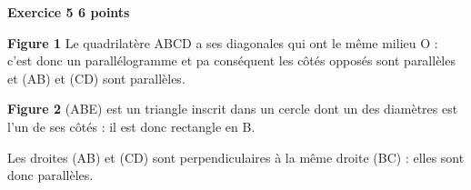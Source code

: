 \textbf{Exercice 5 \hfill 6 points}

\medskip


%
%
% 
%
%
%
%
% 
%
\textbf{Figure 1} Le quadrilatère ABCD a ses diagonales qui ont le même milieu O : c’est donc un parallélogramme et pa conséquent les côtés opposés sont parallèles et (AB) et (CD) sont parallèles.

\textbf{Figure 2} (ABE) est un triangle inscrit dans un cercle dont un des diamètres est l’un de ses côtés : il est donc rectangle en B.

Les droites (AB) et (CD) sont perpendiculaires à la même droite (BC) : elles sont donc parallèles. 
\bigskip

